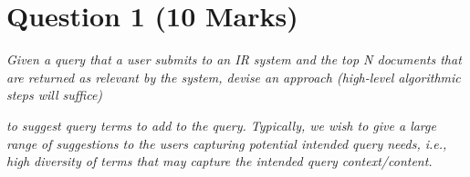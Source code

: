 \setcounter{page}{1}
\pagestyle{fancy}
\fancyhead[L]{\myassignment  \hspace*{1.5mm}- \mycourse} 
\fancyhead[R]{\mydate}


\section{Question 1 (10 Marks)}

\textit{Given a query that a user submits to an IR system and the top N documents that are returned as relevant by the system, devise an approach (high-level algorithmic steps will suffice)}

\textit{to suggest query terms to add to the query. Typically, we wish to give a large range of suggestions to the users capturing potential intended query needs, i.e., high diversity of terms that may capture the intended query context/content.}


















